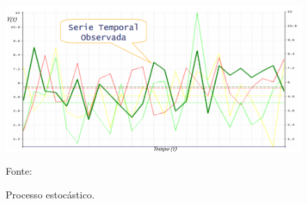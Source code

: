 \begin{figure}[H]
	\centering
	\caption{Processo estocástico.}
	\label{fig:serie}
	\includegraphics[width=1\linewidth]{Revisao/Figuras/serie}
	
	Fonte: \cite{pinheiro_2022}
\end{figure}